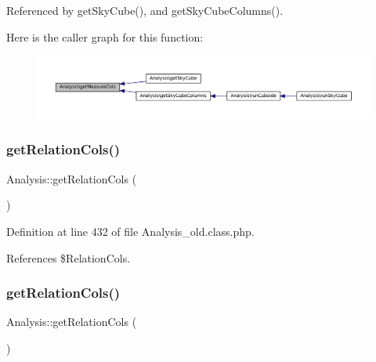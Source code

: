 Referenced by get\+Sky\+Cube(), and get\+Sky\+Cube\+Columns().

Here is the caller graph for this function\+:\nopagebreak
\begin{figure}[H]
\begin{center}
\leavevmode
\includegraphics[width=350pt]{class_analysis_aa2139069d2b1f559a9df6f690c8cf076_icgraph}
\end{center}
\end{figure}
\mbox{\label{class_analysis_a90b84a8fb6cf7b7dbd06ce835300e69c}} 
\subsubsection{\texorpdfstring{get\+Relation\+Cols()}{getRelationCols()}\hspace{0.1cm}{\footnotesize\ttfamily [1/2]}}
{\footnotesize\ttfamily Analysis\+::get\+Relation\+Cols (\begin{DoxyParamCaption}{ }\end{DoxyParamCaption})}



Definition at line 432 of file Analysis\+\_\+old.\+class.\+php.



References \$\+Relation\+Cols.

\mbox{\label{class_analysis_a90b84a8fb6cf7b7dbd06ce835300e69c}} 
\subsubsection{\texorpdfstring{get\+Relation\+Cols()}{getRelationCols()}\hspace{0.1cm}{\footnotesize\ttfamily [2/2]}}
{\footnotesize\ttfamily Analysis\+::get\+Relation\+Cols (\begin{DoxyParamCaption}{ }\end{DoxyParamCaption})}

